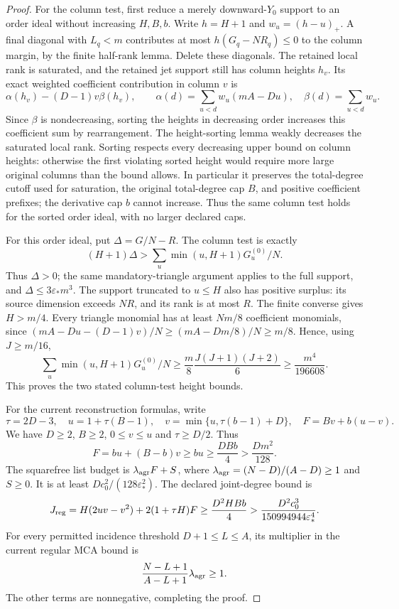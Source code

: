 \begin{proof}
For the column test, first reduce a merely downward-$Y_0$ support to an
order ideal without increasing $H,B,b$. Write $h=H+1$ and
$w_u=(h-u)_+$. A final diagonal with $L_q<m$ contributes at most
$h(G_q-NR_q)\le0$ to the column margin, by the finite half-rank lemma.
Delete these diagonals. The retained local rank is saturated, and the
retained jet support still has column heights $h_v$.
Its exact weighted coefficient contribution in column $v$ is
\[
 \alpha(h_v)-(D-1)v\beta(h_v),\qquad
 \alpha(d)=\sum_{u<d}w_u(mA-Du),\quad
 \beta(d)=\sum_{u<d}w_u.
\]
Since $\beta$ is nondecreasing, sorting the heights in decreasing order
increases this coefficient sum by rearrangement. The height-sorting
lemma weakly decreases the saturated local rank. Sorting respects every
decreasing upper bound on column heights: otherwise the first violating
sorted height would require more large original columns than the bound
allows. In particular it preserves the total-degree cutoff used for
saturation, the original total-degree cap $B$, and positive coefficient
prefixes; the derivative cap $b$ cannot increase. Thus the same column
test holds for the sorted order ideal, with no larger declared caps.

For this order ideal, put $\Delta=G/N-R$. The column test is exactly
\[
 (H+1)\Delta>\sum_u\min(u,H+1)G_u^{(0)}/N.
\]
Thus $\Delta>0$; the same mandatory-triangle argument applies to the full
support, and $\Delta\le3\varepsilon_*m^3$. The support truncated to
$u\le H$ also has positive surplus: its source dimension exceeds $NR$,
and its rank is at most $R$. The finite converse gives $H>m/4$.
Every triangle monomial has at least $Nm/8$ coefficient monomials, since
$(mA-Du-(D-1)v)/N\ge(mA-Dm/8)/N\ge m/8$. Hence, using $J\ge m/16$,
\[
 \sum_u\min(u,H+1)G_u^{(0)}/N
 \ge\frac m8\frac{J(J+1)(J+2)}6
 \ge\frac{m^4}{196608}.
\]
This proves the two stated column-test height bounds.

For the current reconstruction formulas, write
\[
 \tau=2D-3,\quad u=1+\tau(B-1),\quad
 v=\min\{u,\tau(b-1)+D\},\quad F=Bv+b(u-v).
\]
We have $D\ge2$, $B\ge2$, $0\le v\le u$ and $\tau\ge D/2$. Thus
\[
 F=bu+(B-b)v\ge bu\ge\frac{DBb}{4}
 >\frac{Dm^2}{128}.
\]
The squarefree list budget is $\lambda_{\rm agr}F+S$, where
$\lambda_{\rm agr}=(N-D)/(A-D)\ge1$ and $S\ge0$. It is at least
$Dc_0^2/(128\varepsilon_*^2)$. The declared joint-degree bound is
\[
 J_{\rm reg}=H(2uv-v^2)+2(1+\tau H)F
 \ge\frac{D^2HBb}{4}
 >\frac{D^2c_0^3}{150994944\varepsilon_*^4}.
\]
For every permitted incidence threshold $D+1\le L\le A$, its multiplier
in the current regular MCA bound is
\[
 \frac{N-L+1}{A-L+1}\lambda_{\rm agr}\ge1.
\]
The other terms are nonnegative, completing the proof.
\end{proof}

